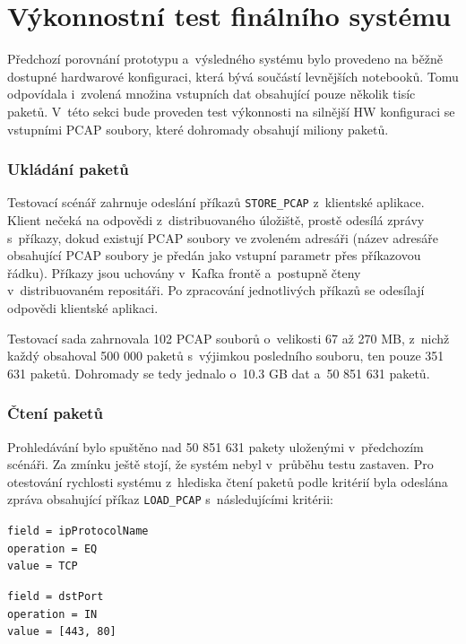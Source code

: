 \section{Výkonnostní test finálního systému}
Předchozí porovnání prototypu a~výsledného systému bylo provedeno na běžně dostupné hardwarové konfiguraci, která bývá součástí levnějších notebooků. Tomu odpovídala i~zvolená množina vstupních dat obsahující pouze několik tisíc paketů. V~této sekci bude proveden test výkonnosti na silnější HW konfiguraci se vstupními PCAP soubory, které dohromady obsahují miliony paketů.

\subsubsection{Ukládání paketů}
Testovací scénář zahrnuje odeslání příkazů \texttt{STORE\_PCAP} z~klientské aplikace. Klient nečeká na odpovědi z~distribuovaného úložiště, prostě odesílá zprávy s~příkazy, dokud existují PCAP soubory ve zvoleném adresáři (název adresáře obsahující PCAP soubory je předán jako vstupní parametr přes příkazovou řádku). Příkazy jsou uchovány v~Kafka frontě a~postupně čteny v~distribuovaném repositáři. Po zpracování jednotlivých příkazů se odesílají odpovědi klientské aplikaci.

Testovací sada zahrnovala 102 PCAP souborů o~velikosti 67 až 270 MB, z~nichž každý obsahoval 500 000 paketů s~výjimkou posledního souboru, ten pouze 351 631 paketů. Dohromady se tedy jednalo o~10.3 GB dat a~50 851 631 paketů.

\subsubsection{Čtení paketů}
Prohledávání bylo spuštěno nad 50 851 631 pakety uloženými v~předchozím scénáři. Za zmínku ještě stojí, že systém nebyl v~průběhu testu zastaven. Pro otestování rychlosti systému z~hlediska čtení paketů podle kritérií byla odeslána zpráva obsahující příkaz \texttt{LOAD\_PCAP} s~následujícími kritérii:

\vspace{0.5cm}
\texttt{field = ipProtocolName} \\
\indent \texttt{operation = EQ} \\
\indent \texttt{value = TCP}

\vspace{0.5cm}
\texttt{field = dstPort} \\
\indent \texttt{operation = IN} \\
\indent \texttt{value = [443, 80]}

